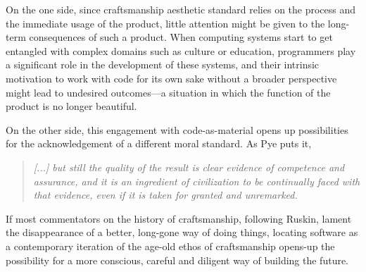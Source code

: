 \documentclass{article}
\begin{document}
On the one side, since craftsmanship aesthetic standard relies on the process and the immediate usage of the product, little attention might be given to the long-term consequences of such a product. When computing systems start to get entangled with complex domains such as culture\cite{seaver_captivating_2019} or education\cite{perrotta_programming_2020}, programmers play a significant role in the development of these systems\cite{levy_programmation_1992}, and their intrinsic motivation to work with code for its own sake without a broader perspective might lead to undesired outcomes---a situation in which the function of the product is no longer beautiful.

On the other side, this engagement with code-as-material opens up possibilities for the acknowledgement of a different moral standard. As Pye puts it,

\begin{quote}
    \textit{[...] but still the quality of the result is clear evidence of competence and assurance, and it is an ingredient of civilization to be continually faced with that evidence, even if it is taken for granted and unremarked.\cite{pye_nature_2008}}
\end{quote}

If most commentators on the history of craftsmanship, following Ruskin, lament the disappearance of a better, long-gone way of doing things, locating software as a contemporary iteration of the age-old ethos of craftsmanship opens-up the possibility for a more conscious, careful and diligent way of building the future.



\end{document}
